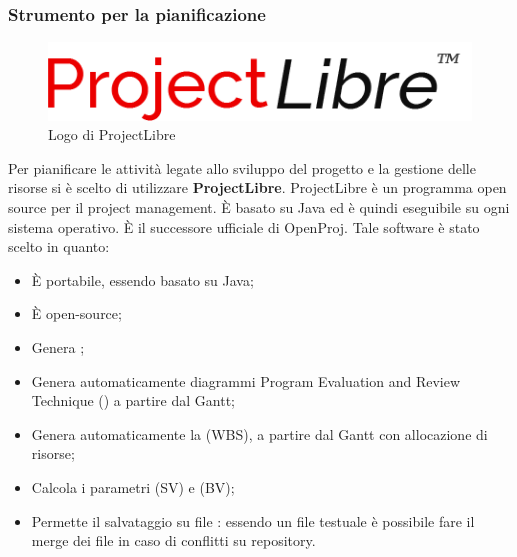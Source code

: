 \documentclass[../NormeDiProgetto.tex]{subfiles}
\begin{document}
			\subsubsection{Strumento per la pianificazione}
			\begin{figure} [h!]
				\centering
				\includegraphics[scale=0.3]{./Immagini/Libre.png}
				\caption{Logo di ProjectLibre}\label{}
			\end{figure}
			Per pianificare le attività legate allo sviluppo del progetto e la gestione delle risorse
			si è scelto di utilizzare \textbf{ProjectLibre}.
			ProjectLibre è un programma open source per il project management. È basato su Java ed è
			quindi eseguibile su ogni sistema operativo. È il successore ufficiale di OpenProj. Tale
			software è stato scelto in quanto:
			\begin{itemize}
				\item È portabile, essendo basato su Java;
				\item È open-source;
				\item Genera ;
				\item Genera automaticamente diagrammi Program Evaluation and Review Technique ()
				a partire dal Gantt;
				\item Genera automaticamente la  (WBS), a partire dal Gantt
				con allocazione di risorse;
				\item Calcola i parametri (SV) e  (BV);
				\item Permette il salvataggio su file : essendo un file testuale è possibile
				fare il merge dei file in caso di conflitti su repository. 
			\end{itemize}
\end{document}
